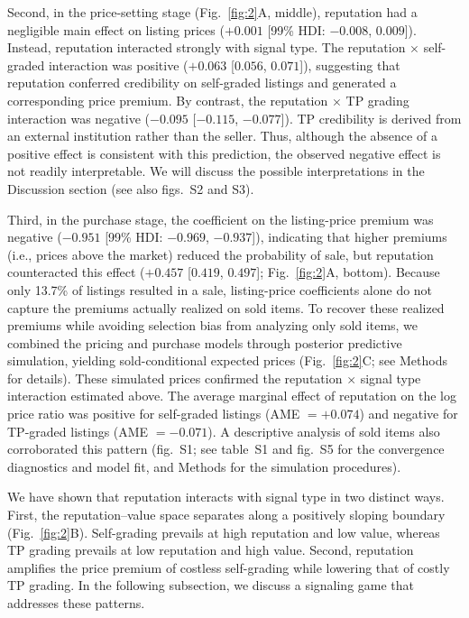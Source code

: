 \documentclass[11pt,letterpaper]{article}
\theoremstyle{definition}
\begin{document}
Second, in the price-setting stage (Fig.~\ref{fig:2}A, middle), reputation had a negligible main effect on listing prices ($+0.001$ [99\% HDI: $-0.008$, $0.009$]). Instead, reputation interacted strongly with signal type. The reputation $\times$ self-graded interaction was positive ($+0.063$ [$0.056$, $0.071$]), suggesting that reputation conferred credibility on self-graded listings and generated a corresponding price premium. By contrast, the reputation $\times$ TP grading interaction was negative ($-0.095$ [$-0.115$, $-0.077$]). TP credibility is derived from an external institution rather than the seller. Thus, although the absence of a positive effect is consistent with this prediction, the observed negative effect is not readily interpretable. We will discuss the possible interpretations in the Discussion section (see also figs.~S2 and S3).

Third, in the purchase stage, the coefficient on the listing-price premium was negative ($-0.951$ [99\% HDI: $-0.969$, $-0.937$]), indicating that higher premiums (i.e., prices above the market) reduced the probability of sale, but reputation counteracted this effect ($+0.457$ [$0.419$, $0.497$]; Fig.~\ref{fig:2}A, bottom). Because only 13.7\% of listings resulted in a sale, listing-price coefficients alone do not capture the premiums actually realized on sold items. To recover these realized premiums while avoiding selection bias from analyzing only sold items, we combined the pricing and purchase models through posterior predictive simulation, yielding sold-conditional expected prices (Fig.~\ref{fig:2}C; see Methods for details). These simulated prices confirmed the reputation $\times$ signal type interaction estimated above. The average marginal effect of reputation on the log price ratio was positive for self-graded listings (AME $= +0.074$) and negative for TP-graded listings (AME $= -0.071$). A descriptive analysis of sold items also corroborated this pattern (fig.~S1; see table~S1 and fig.~S5 for the convergence diagnostics and model fit, and Methods for the simulation procedures).

We have shown that reputation interacts with signal type in two distinct ways. First, the reputation--value space separates along a positively sloping boundary (Fig.~\ref{fig:2}B). Self-grading prevails at high reputation and low value, whereas TP grading prevails at low reputation and high value. Second, reputation amplifies the price premium of costless self-grading while lowering that of costly TP grading. In the following subsection, we discuss a signaling game that addresses these patterns.
\end{document}
